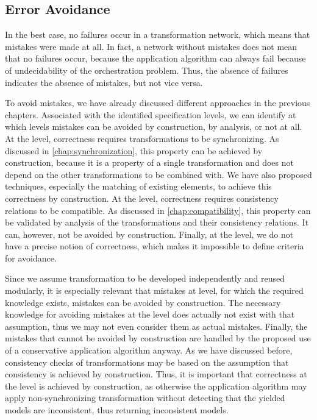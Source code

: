 \subsection{Error Avoidance}

In the best case, no failures occur in a transformation network, which means that mistakes were made at all.
In fact, a network without mistakes does not mean that no failures occur, because the application algorithm can always fail because of undecidability of the orchestration problem.
Thus, the absence of failures indicates the absence of mistakes, but not vice versa.

To avoid mistakes, we have already discussed different approaches in the previous chapters.
Associated with the identified specification levels, we can identify at which levels mistakes can be avoided by construction, by analysis, or not at all.
At the \leveltransformation level, correctness requires transformations to be synchronizing.
As discussed in \autoref{chap:synchronization}, this property can be achieved by construction, because it is a property of a single transformation and does not depend on the other transformations to be combined with.
We have also proposed techniques, especially the matching of existing elements, to achieve this correctness by construction.
At the \levelnetworkrelation level, correctness requires consistency relations to be compatible.
As discussed in \autoref{chap:compatibility}, this property can be validated by analysis of the transformations and their consistency relations.
It can, however, not be avoided by construction.
Finally, at the \levelnetworkrule level, we do not have a precise notion of correctness, which makes it impossible to define criteria for avoidance.

Since we assume transformation to be developed independently and reused modularly, it is especially relevant that mistakes at \leveltransformation level, for which the required knowledge exists, mistakes can be avoided by construction.
The necessary knowledge for avoiding mistakes at the \levelnetworkrelation level does actually not exist with that assumption, thus we may not even consider them as actual mistakes.
Finally, the mistakes that cannot be avoided by construction are handled by the proposed use of a conservative application algorithm anyway.
As we have discussed before, consistency checks of transformations may be based on the assumption that consistency is achieved by construction.
Thus, it is important that correctness at the \leveltransformation level is achieved by construction, as otherwise the application algorithm may apply non-synchronizing transformation without detecting that the yielded models are inconsistent, thus returning inconsistent models.

